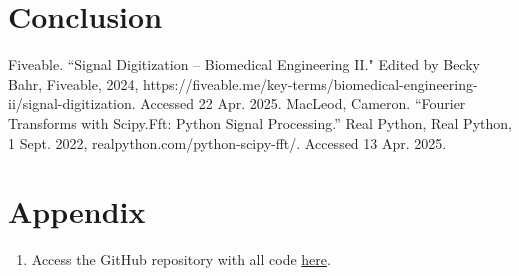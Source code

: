 \documentclass{article}
\begin{document}
    



\section{Conclusion}

\begin{thebibliography}{9}
     Fiveable. ``Signal Digitization -- Biomedical Engineering II." Edited by Becky Bahr, Fiveable, 2024, https://fiveable.me/key-terms/biomedical-engineering-ii/signal-digitization. Accessed 22 Apr. 2025.
     MacLeod, Cameron. “Fourier Transforms with Scipy.Fft: Python Signal Processing.” Real Python, Real Python, 1 Sept. 2022, realpython.com/python-scipy-fft/. Accessed 13 Apr. 2025. 
\end{thebibliography}


\section{Appendix}
\begin{enumerate}
    \item Access the GitHub repository with all code \href{https://github.com/margheritatonon/approximation-II-assignment}{here}.
\end{enumerate}
\end{document}
